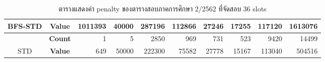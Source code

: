 \begin{table}[]
{\begin{tabular}{@{}ccrrrrrrrr@{}}
    \multirow{-2}{*}{BFS-STD}                    & \textbf{Value}                        & 1011393                        & 40000                          & 287196                         & 112866                         & 27246                          & 17255                          & 117120                         & 1613076                          \\ \midrule
                                                  & {\textbf{Count}} & {1}       & {5}       & {2850}    & {969}     & {731}     & {523}     & {9420}    & {14499}     \\ \cmidrule(l){2-10} 
    \multirow{-2}{*}{STD} & {\textbf{Value}} & {649}     & {50000}   & {222300}  & {75582}   & {27778}   & {15167}   & {113040}  & {504516}    \\ \bottomrule
    \end{tabular}%
    }
    \caption{ตารางแสดงค่า penalty ของตารางสอบภาคการศึกษา 2/2562 ที่จัดสอบ 36 slots}
    \label{tab:result_table_262_36}
\end{table}
